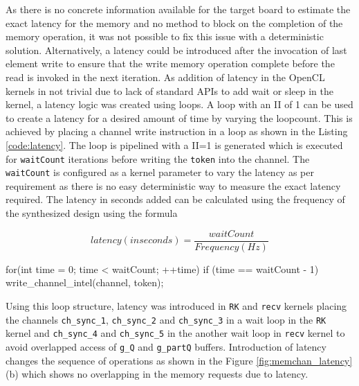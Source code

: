 As there is no concrete information available for the target board to estimate
the exact latency for the memory and no method to block on the
completion of the memory operation, it was not possible to fix this issue with
a deterministic solution. Alternatively, a latency could be introduced after the
invocation of last element write to ensure that the write memory operation complete before
the read is invoked in the next iteration. As addition of latency in the OpenCL
kernels in not trivial due to lack of standard APIs to add wait or sleep in the kernel,
a latency logic was created using loops. A loop with an \ac{II}
of 1 can be used to create a latency for a desired amount of time by varying the
loopcount. This is achieved by placing a channel write instruction in a loop
as shown in the Listing \ref{code:latency}. The loop is pipelined with a II=1
is generated which is executed for \texttt{waitCount} iterations before writing
the \texttt{token} into the channel. The \texttt{waitCount} is configured as a kernel
parameter to vary the latency as per requirement as there is no easy deterministic way to measure
the exact latency required. The latency in seconds added can be calculated using the
frequency of the synthesized design using the formula

$$ latency(in seconds) = \frac{waitCount}{Frequency(Hz)} $$

\begin{CppCode}[caption=Loop structure used to add latency in the kernels, frame=tlrb, label=code:latency, float]
for(int time = 0; time < waitCount; ++time)
{
    if (time == waitCount - 1)
    {
        write_channel_intel(channel, token);
    }
}
\end{CppCode}

Using this loop structure, latency was introduced
in \texttt{RK} and \texttt{recv} kernels placing the channels \texttt{ch\_sync\_1},
\texttt{ch\_sync\_2} and \texttt{ch\_sync\_3} in a wait loop in the \texttt{RK} kernel and \texttt{ch\_sync\_4}
and \texttt{ch\_sync\_5} in the another wait loop in \texttt{recv} kernel to avoid
overlapped access of \texttt{g\_Q} and \texttt{g\_partQ} buffers. Introduction
of latency changes the sequence of operations as shown in the Figure \ref{fig:memchan_latency} (b)
which shows no overlapping in the memory requests due to latency.


